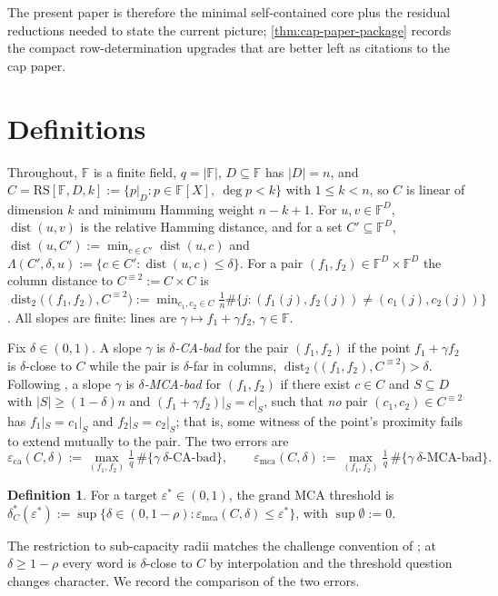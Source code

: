 \documentclass[11pt]{amsart}
\theoremstyle{definition}
\newtheorem{definition}[definition]{Definition}
\theoremstyle{remark}
\newcommand{\F}{\mathbb{F}}
\newcommand{\RS}{\mathrm{RS}}
\newcommand{\dist}{\operatorname{dist}}
\newcommand{\eca}{\varepsilon_{\mathrm{ca}}}
\newcommand{\emca}{\varepsilon_{\mathrm{mca}}}
\newcommand{\Lst}{\Lambda}
\begin{document}
The present paper is therefore the minimal self-contained core plus the residual reductions needed to state the current picture; \cref{thm:cap-paper-package} records the compact row-determination upgrades that are better left as citations to the cap paper.

\section{Definitions}\label{sec:defs}

Throughout, $\F$ is a finite field, $q=|\F|$, $D\subseteq\F$ has $|D|=n$, and $C=\RS[\F,D,k]:=\{p|_D:p\in\F[X],\ \deg p<k\}$ with $1\le k<n$, so $C$ is linear of dimension $k$ and minimum Hamming weight $n-k+1$. For $u,v\in\F^D$, $\dist(u,v)$ is the relative Hamming distance, and for a set $C'\subseteq\F^D$, $\dist(u,C'):=\min_{c\in C'}\dist(u,c)$ and $\Lst(C',\delta,u):=\{c\in C':\dist(u,c)\le\delta\}$. For a pair $(f_1,f_2)\in\F^D\times\F^D$ the column distance to $C^{\equiv2}:=C\times C$ is $\dist_2\bigl((f_1,f_2),C^{\equiv2}\bigr):=\min_{c_1,c_2\in C}\frac1n\#\{j:(f_1(j),f_2(j))\ne(c_1(j),c_2(j))\}$. All slopes are finite: lines are $\gamma\mapsto f_1+\gamma f_2$, $\gamma\in\F$.

Fix $\delta\in(0,1)$. A slope $\gamma$ is \emph{$\delta$-CA-bad} for the pair $(f_1,f_2)$ if the point $f_1+\gamma f_2$ is $\delta$-close to $C$ while the pair is $\delta$-far in columns, $\dist_2\bigl((f_1,f_2),C^{\equiv2}\bigr)>\delta$. Following \cite[Defs.~4.1, 4.3]{ABF26}, a slope $\gamma$ is \emph{$\delta$-MCA-bad} for $(f_1,f_2)$ if there exist $c\in C$ and $S\subseteq D$ with $|S|\ge(1-\delta)n$ and $(f_1+\gamma f_2)|_S=c|_S$, such that \emph{no} pair $(c_1,c_2)\in C^{\equiv2}$ has $f_1|_S=c_1|_S$ and $f_2|_S=c_2|_S$; that is, some witness of the point's proximity fails to extend mutually to the pair. The two errors are
\[
\eca(C,\delta):=\max_{(f_1,f_2)}\tfrac1q\,\#\{\gamma\ \text{$\delta$-CA-bad}\},
\qquad
\emca(C,\delta):=\max_{(f_1,f_2)}\tfrac1q\,\#\{\gamma\ \text{$\delta$-MCA-bad}\}.
\]

\begin{definition}\label{def:dstar}
For a target $\varepsilon^*\in(0,1)$, the grand MCA threshold is
$\delta^*_C(\varepsilon^*):=\sup\{\delta\in(0,1-\rho):\emca(C,\delta)\le\varepsilon^*\}$, with $\sup\emptyset:=0$.
\end{definition}

The restriction to sub-capacity radii matches the challenge convention of \cite{ABF26,ProximityPrize}; at $\delta\ge1-\rho$ every word is $\delta$-close to $C$ by interpolation and the threshold question changes character. We record the comparison of the two errors.
\end{document}
